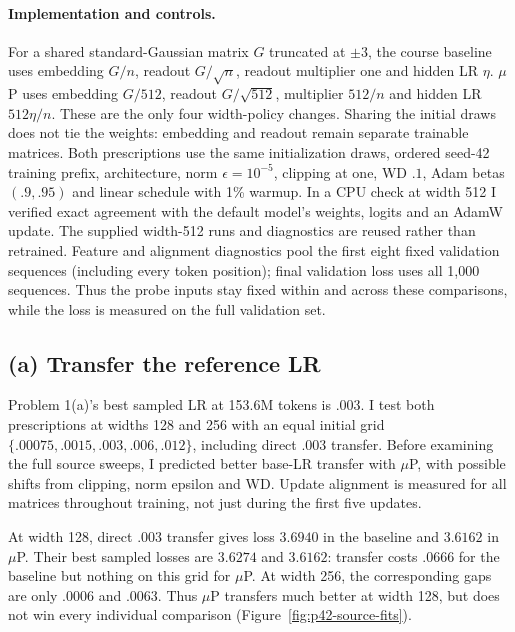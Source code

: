 \documentclass{article}
\begin{document}
\paragraph{Implementation and controls.} For a shared standard-Gaussian
matrix $G$ truncated at $\pm3$, the course baseline uses embedding $G/n$,
readout $G/\sqrt n$, readout multiplier one and hidden LR $\eta$.
$\mu$P uses embedding $G/512$, readout $G/\sqrt{512}$, multiplier $512/n$
and hidden LR $512\eta/n$. These are the only four width-policy changes.
Sharing the initial draws does not tie the weights: embedding and readout
remain separate trainable matrices.
Both prescriptions use the same initialization draws, ordered seed-42
training prefix, architecture, norm $\epsilon=10^{-5}$, clipping at one,
WD $.1$, Adam betas $(.9,.95)$ and linear schedule with 1\% warmup.
In a CPU check at width 512 I verified exact agreement with the default model's weights,
logits and an AdamW update. The supplied width-512 runs and diagnostics
are reused rather than retrained.
Feature and alignment diagnostics pool the first eight fixed validation
sequences (including every token position); final validation loss uses
all 1,000 sequences. Thus the probe inputs stay fixed within and across
these comparisons, while the loss is measured on the full validation set.

\subsection{(a) Transfer the reference LR}

Problem 1(a)'s best sampled LR at 153.6M tokens is $.003$.
I test both prescriptions at widths 128 and 256 with an equal initial grid
$\{.00075,\allowbreak.0015,\allowbreak.003,\allowbreak.006,\allowbreak.012\}$, including direct $.003$ transfer.
Before examining the full source sweeps, I predicted better base-LR
transfer with $\mu$P, with possible shifts from clipping, norm epsilon
and WD. Update alignment is measured for all matrices throughout
training, not just during the first five updates.

At width 128, direct $.003$ transfer gives loss $3.6940$ in the baseline
and $3.6162$ in $\mu$P. Their best sampled losses are $3.6274$ and
$3.6162$: transfer costs $.0666$ for the baseline but nothing on this
grid for $\mu$P. At width 256, the corresponding gaps are only $.0006$
and $.0063$. Thus $\mu$P transfers much better at width 128, but does
not win every individual comparison (Figure~\ref{fig:p42-source-fits}).
\end{document}
